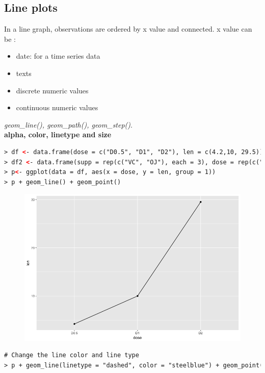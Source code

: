 \subsection{Line plots}
In a line graph, observations are ordered by x value and connected.\newline
x value can be :
\begin{itemize}
  \item date: for a time series data
  \item texts
  \item discrete numeric values
  \item continuous numeric values
\end{itemize}
\textit{geom\_line(), geom\_path(), geom\_step()}.\newline
\\
\textbf{alpha, color, linetype and size}
\begin{lstlisting}[language=html]
> df <- data.frame(dose = c("D0.5", "D1", "D2"), len = c(4.2,10, 29.5))
> df2 <- data.frame(supp = rep(c("VC", "OJ"), each = 3), dose = rep(c("D0.5", "D1", "D2"),2 ), len = c(6.8, 15, 33, 4.2, 10, 29.5))
> p<- ggplot(data = df, aes(x = dose, y = len, group = 1))
> p + geom_line() + geom_point()
\end{lstlisting}
\begin{figure}[H]\begin{center}\includegraphics[scale=1 ]{ilu/bg119.png}\end{center}\end{figure}
\begin{lstlisting}[language=html]
# Change the line color and line type
> p + geom_line(linetype = "dashed", color = "steelblue") + geom_point(color = "steelblue")
\end{lstlisting}
